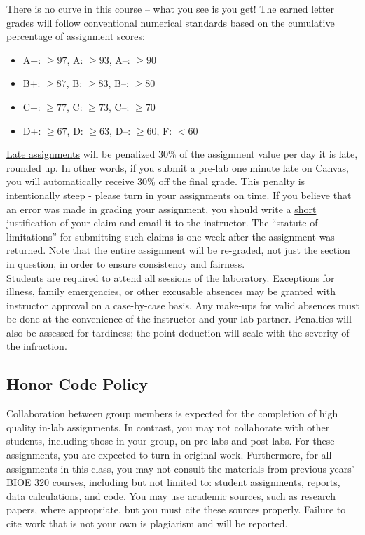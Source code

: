 \documentclass{article}
\begin{document}
There is no curve in this course -- what you see is you get! The earned letter grades will follow conventional numerical standards based on the cumulative percentage of assignment scores:
\begin{itemize}
	\item A+: $\geq 97$, A: $\geq 93$, A--: $\geq 90$
	\item B+: $\geq 87$, B: $\geq 83$, B--: $\geq 80$
	\item C+: $\geq 77$, C: $\geq 73$, C--: $\geq 70$
	\item D+: $\geq 67$, D: $\geq 63$, D--: $\geq 60$, F: $< 60$
\end{itemize}

\underline{Late assignments} will be penalized 30\% of the assignment value per day it is late, rounded up. In other words, if you submit a pre-lab one minute late on Canvas, you will automatically receive 30\% off the final grade. This penalty is intentionally steep - please turn in your assignments on time. If you believe that an error was made in grading your assignment, you should write a \underline{short} justification of your claim and email it to the instructor. The “statute of limitations” for submitting such claims is one week after the assignment was returned. Note that the entire assignment will be re-graded, not just the section in question, in order to ensure consistency and fairness.\\

Students are required to attend all sessions of the laboratory. Exceptions for illness, family emergencies, or other excusable absences may be granted with instructor approval on a case-by-case basis. Any make-ups for valid absences must be done at the convenience of the instructor and your lab partner. Penalties will also be assessed for tardiness; the point deduction will scale with the severity of the infraction.

\subsection*{Honor Code Policy}
Collaboration between group members is expected for the completion of high quality in-lab assignments. In contrast, you may not collaborate with other students, including those in your group, on pre-labs and post-labs. For these assignments, you are expected to turn in original work. Furthermore, for all assignments in this class, you may not consult the materials from previous years' BIOE 320 courses, including but not limited to: student assignments, reports, data calculations, and code. You may use academic sources, such as research papers, where appropriate, but you must cite these sources properly. Failure to cite work that is not your own is plagiarism and will be reported.
\end{document}
